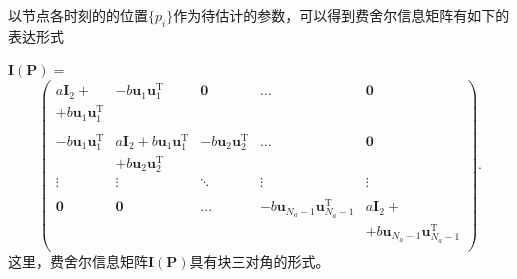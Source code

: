 %
%

\begin{frame}
以节点各时刻的的位置$\{p_i\}$作为待估计的参数，可以得到费舍尔信息矩阵有如下的表达形式


$\bm{I}(\bm{P})=$
\[
\begin{pmatrix}
a\bm{I}_2+&-b\bm{u}_1\bm{u}_1^{\textrm{T}}&\bm{0}&\dots&\bm{0}\\
+b\bm{u}_1\bm{u}_1^{\textrm{T}}&&&&\\
&&&&\\
-b\bm{u}_1\bm{u}_1^{\textrm{T}} & a\bm{I}_2+b\bm{u}_1\bm{u}_1^{\textrm{T}}&-b\bm{u}_2\bm{u}_2^{\textrm{T}}&\dots&\bm{0}\\
&+b\bm{u}_2\bm{u}_2^{\textrm{T}}&&&\\
\vdots &\vdots&\ddots &\vdots&\vdots\\
&&&&\\
\bm{0}&\bm{0}&...& -b\bm{u}_{N_a-1}\bm{u}_{N_a-1}^{\textrm{T}}&a\bm{I}_2+\\
&&&&+b\bm{u}_{N_a-1}\bm{u}_{N_a-1}^{\textrm{T}}\\
\end{pmatrix}.
\]
\pause
这里，费舍尔信息矩阵$\bm{I}(\bm{P})$具有块三对角的形式。
\end{frame}

